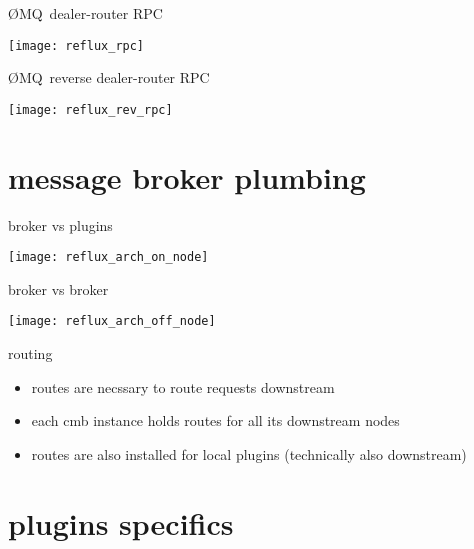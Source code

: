 \documentclass[default,pdf,colorBG,slideColor]{prosper}
\newcommand{\zMQ}{\O{}MQ}
\begin{document}
\begin{slide}{\zMQ\ dealer-router RPC}{\small
\begin{center}
  \texttt{[image: reflux\_rpc]}
\end{center}
}\end{slide}

\begin{slide}{\zMQ\ reverse dealer-router RPC}{\small
\begin{center}
  \texttt{[image: reflux\_rev\_rpc]}
\end{center}
}\end{slide}

\part{message broker plumbing}

\begin{slide}{broker vs plugins}{\small
\begin{center}
  \texttt{[image: reflux\_arch\_on\_node]}
\end{center}
}\end{slide}

\begin{slide}{broker vs broker}{\small
\begin{center}
  \texttt{[image: reflux\_arch\_off\_node]}
\end{center}
}\end{slide}

\begin{slide}{routing}{\small
\begin{itemize}
  \item{routes are necssary to route requests downstream}
  \item{each cmb instance holds routes for all its downstream nodes}
  \item{routes are also installed for local plugins
        (technically also downstream)}
\end{itemize}
}\end{slide}


\part{plugins specifics}
\end{document}
